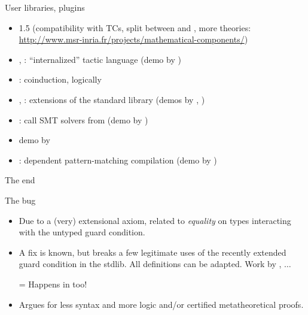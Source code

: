 

\begin{subsecframe}{User libraries, plugins}

  \begin{itemize}
  \item {} 1.5 (compatibility with TCs, split between
     and , more theories: \url{http://www.msr-inria.fr/projects/mathematical-components/})
  \item {}, : ``internalized'' tactic language
    (demo by )
  \item {}: coinduction, logically
  \item {}, : extensions of the standard library
    (demos by , )
  \item {}: call SMT solvers from \Coq (demo by )
  \item {} demo by 
  \item {}: dependent pattern-matching compilation (demo
    by )
  \end{itemize}
  
\end{subsecframe}

\begin{subsecframe}{The end}
\end{subsecframe}

\begin{subsecframe}{The bug}
  \begin{itemize}
  \item Due to a (very) extensional axiom, related to \emph{equality} on
    types interacting with the untyped guard condition.
  \item A fix is known, but breaks a few legitimate uses of the recently
    extended guard condition in the stdlib. All definitions can be
    adapted. Work by , $\ldots$
  \item[=] Happens in  too!
  \item Argues for less syntax and more logic and/or
    certified metatheoretical proofs.
  \end{itemize}
\end{subsecframe}



